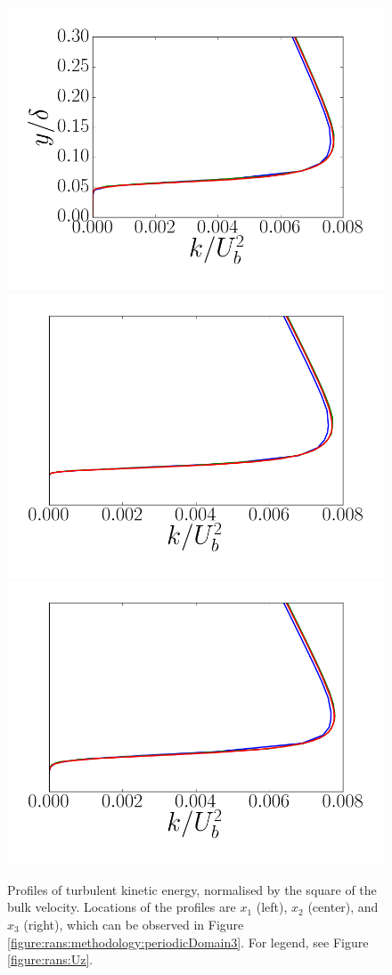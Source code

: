 \documentclass[12pt,oneside,a4paper]{article}
\begin{document}
\begin{figure}
\centering
\includegraphics[width=0.33\linewidth]{images/CFD_meshIndependence/X1_k.png}\hfill \includegraphics[width=0.33\linewidth]{images/CFD_meshIndependence/X2_k.png}\hfill
\includegraphics[width=0.33\linewidth]{images/CFD_meshIndependence/X3_k.png}\hfill
\caption{Profiles of turbulent kinetic energy, normalised by the square of the bulk velocity. Locations of the profiles are $x_1$ (left), $x_2$ (center), and $x_3$ (right), which can be observed in Figure \ref{figure:rans:methodology:periodicDomain3}. For legend, see Figure \ref{figure:rans:Uz}.}
\label{figure:rans:k}
\end{figure}
\end{document}
